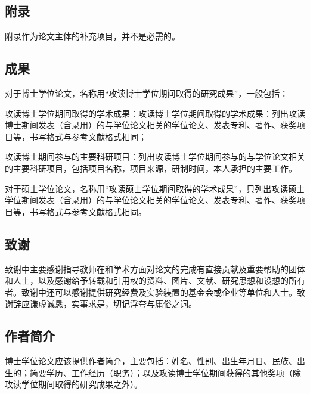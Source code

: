 \subsection{附录}

附录作为论文主体的补充项目，并不是必需的。

\subsection{成果}

对于博士学位论文，名称用“攻读博士学位期间取得的研究成果”，一般包括：

攻读博士学位期间取得的学术成果：攻读博士学位期间取得的学术成果：列出攻读博士期间发表（含录用）的与学位论文相关的学位论文、发表专利、著作、获奖项目等，书写格式与参考文献格式相同；

攻读博士期间参与的主要科研项目：列出攻读博士学位期间参与的与学位论文相关的主要科研项目，包括项目名称，项目来源，研制时间，本人承担的主要工作。

对于硕士学位论文，名称用“攻读硕士学位期间取得的学术成果”，只列出攻读硕士学位期间发表（含录用）的与学位论文相关的学位论文、发表专利、著作、获奖项目等，书写格式与参考文献格式相同。

\subsection{致谢}
致谢中主要感谢指导教师在和学术方面对论文的完成有直接贡献及重要帮助的团体和人士，以及感谢给予转载和引用权的资料、图片、文献、研究思想和设想的所有者。致谢中还可以感谢提供研究经费及实验装置的基金会或企业等单位和人士。致谢辞应谦虚诚恳，实事求是，切记浮夸与庸俗之词。

\subsection{作者简介}

博士学位论文应该提供作者简介，主要包括：姓名、性别、出生年月日、民族、出生的；简要学历、工作经历（职务）；以及攻读博士学位期间获得的其他奖项（除攻读学位期间取得的研究成果之外）。
